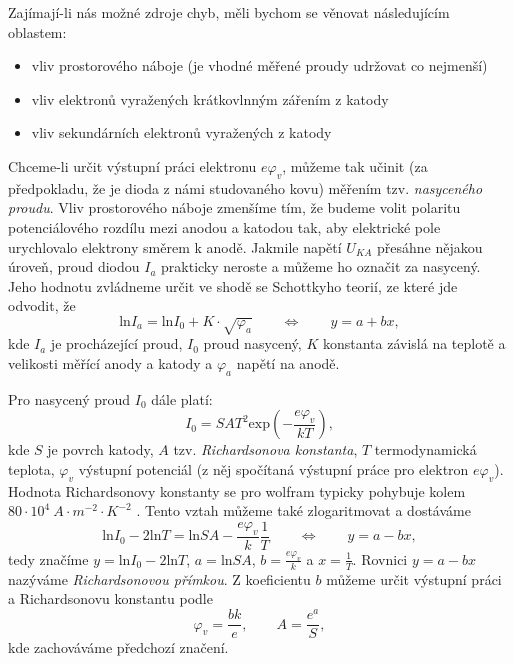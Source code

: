 \documentclass[english]{article}
\begin{document}
		Zajímají-li nás možné zdroje chyb, měli bychom se věnovat následujícím oblastem:
		\begin{itemize}
			\item vliv prostorového náboje (je vhodné měřené proudy udržovat co nejmenší)
			\item vliv elektronů vyražených krátkovlnným zářením z katody
			\item vliv sekundárních elektronů vyražených z katody
		\end{itemize}
		
		Chceme-li určit výstupní práci elektronu $e\varphi_v$, můžeme tak učinit (za předpokladu, že je dioda z námi studovaného kovu) měřením tzv. \emph{nasyceného proudu}. Vliv prostorového náboje zmenšíme tím, že budeme volit polaritu potenciálového rozdílu mezi anodou a katodou tak, aby elektrické pole urychlovalo elektrony směrem k anodě. Jakmile napětí $U_{KA}$ přesáhne nějakou úroveň, proud diodou $I_a$ prakticky neroste a můžeme ho označit za nasycený. Jeho hodnotu zvládneme určit ve shodě se Schottkyho teorií, ze které jde odvodit, že 
		\begin{equation}
			\mathrm{ln}I_a = \mathrm{ln}I_0+K\cdot\sqrt{\varphi_a}
			\qquad\Leftrightarrow\qquad y=a+bx,
			\label{eq:sqrt_fit}
		\end{equation}
		kde $I_a$ je procházející proud, $I_0$ proud nasycený, $K$ konstanta závislá na teplotě a velikosti měřící anody a katody a $\varphi_a$ napětí na anodě.
		
		Pro nasycený proud $I_0$ dále platí:
		\begin{equation}
			I_0 = SAT^2\mathrm{exp}\left(-\frac{e\varphi_v}{kT}\right),
		\end{equation}
		kde $S$ je povrch katody, $A$ tzv. \emph{Richardsonova konstanta}, $T$ termodynamická teplota, $\varphi_v$ výstupní potenciál (z něj spočítaná výstupní práce pro elektron $e\varphi_v$). Hodnota Richardsonovy konstanty se pro wolfram typicky pohybuje kolem $80\cdot 10^4~A\cdot m^{-2} \cdot K^{-2}$ \cite{bib:tabulky}. Tento vztah můžeme také zlogaritmovat a dostáváme
		\begin{equation}
			\mathrm{ln}I_0-2\mathrm{ln}T=\mathrm{ln}SA-\frac{e\varphi_v}{k}\frac{1}{T}
			\qquad\Leftrightarrow\qquad y=a-bx,
			\label{eq:fit_richardson}
		\end{equation}
		tedy značíme $y=\mathrm{ln}I_0-2\mathrm{ln}T$, $a=\mathrm{ln}SA$, $b=\frac{e\varphi_v}{k}$ a $x=\frac{1}{T}$. Rovnici $y=a-bx$ nazýváme \emph{Richardsonovou přímkou}. Z koeficientu $b$ můžeme určit výstupní práci a Richardsonovu konstantu podle 
		\begin{equation}
			\varphi_v = \frac{bk}{e}, \qquad A=\frac{e^a}{S},
			\label{eq:phi_a_A}
		\end{equation}
		kde zachováváme předchozí značení.
		
\end{document}
